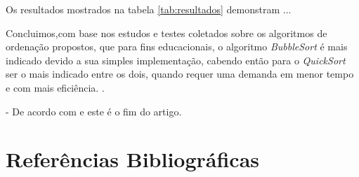 \documentclass[a4paper,10pt]{article}  %
\begin{document}
  Os resultados mostrados na tabela \ref{tab:resultados} demonstram ...


   Concluimos,com base nos estudos e testes coletados sobre os algoritmos de ordenação propostos, que para fins educacionais, o algoritmo \textit{BubbleSort} é mais indicado devido a sua simples implementação, cabendo então para o \textit{QuickSort} ser o mais indicado entre os dois, quando requer uma demanda em menor tempo e com mais eficiência.
.

 - De acordo com \cite{Benante2008phd} e este é o fim do artigo.


\section*{Referências Bibliográficas}

\nocite{*}


%



\end{document}
